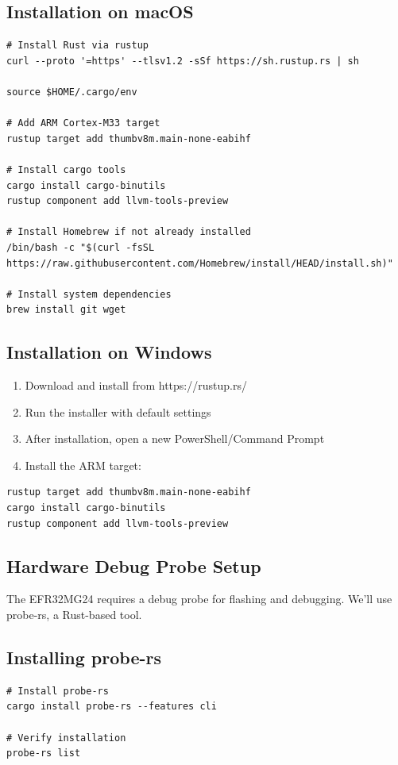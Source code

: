 \subsection{Installation on macOS}
\label{subsec:install-macos}
\begin{verbatim}
# Install Rust via rustup
curl --proto '=https' --tlsv1.2 -sSf https://sh.rustup.rs | sh

source $HOME/.cargo/env

# Add ARM Cortex-M33 target
rustup target add thumbv8m.main-none-eabihf

# Install cargo tools
cargo install cargo-binutils
rustup component add llvm-tools-preview

# Install Homebrew if not already installed
/bin/bash -c "$(curl -fsSL https://raw.githubusercontent.com/Homebrew/install/HEAD/install.sh)"

# Install system dependencies
brew install git wget
\end{verbatim}
\subsection{Installation on Windows}
\label{subsec:install-windows}
\begin{enumerate}
    \item Download and install from https://rustup.rs/
    \item Run the installer with default settings
    \item After installation, open a new PowerShell/Command Prompt
    \item Install the ARM target:
\end{enumerate}

\begin{verbatim}
rustup target add thumbv8m.main-none-eabihf
cargo install cargo-binutils
rustup component add llvm-tools-preview
\end{verbatim}

\subsection{Hardware Debug Probe Setup}
\label{sec:debug-probe-setup}

The EFR32MG24 requires a debug probe for flashing and debugging. We'll use probe-rs, a Rust-based tool.

\subsection{Installing probe-rs}
\label{subsec:install-probe-rs}
\begin{verbatim}
# Install probe-rs
cargo install probe-rs --features cli

# Verify installation
probe-rs list
\end{verbatim}


